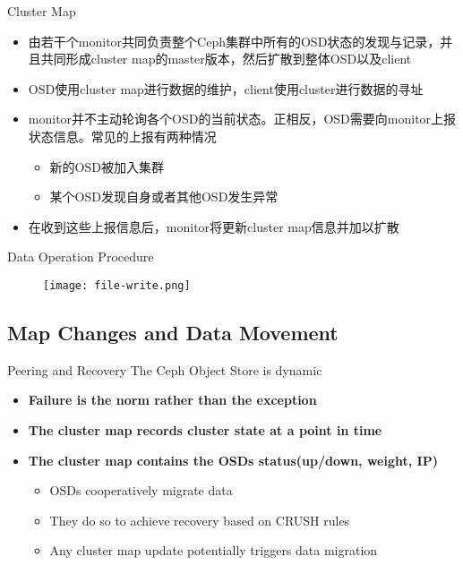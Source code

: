 \begin{frame}{Cluster Map}
    \begin{itemize}
        \item 由若干个monitor共同负责整个Ceph集群中所有的OSD状态的发现与记录，并且共同形成cluster map的master版本，然后扩散到整体OSD以及client
        \item OSD使用cluster map进行数据的维护，client使用cluster进行数据的寻址
        \item monitor并不主动轮询各个OSD的当前状态。正相反，OSD需要向monitor上报状态信息。常见的上报有两种情况
            \begin{itemize}
                \item 新的OSD被加入集群
                \item 某个OSD发现自身或者其他OSD发生异常
            \end{itemize}
        \item 在收到这些上报信息后，monitor将更新cluster map信息并加以扩散
    \end{itemize}
\end{frame}

\begin{frame}{Data Operation Procedure}
    \begin{figure}[htpb]
        \centering
        \texttt{[image: file-write.png]}
    \end{figure}
\end{frame}

\subsection{Map Changes and Data Movement}

\begin{frame}{Peering and Recovery}
    The Ceph Object Store is dynamic
    \begin{itemize}
        \item \textbf{Failure is the norm rather than the exception}
        \item \textbf{The cluster map records cluster state at a point in time}
        \item \textbf{The cluster map contains the OSDs status(up/down, weight, IP)}
            \begin{itemize}
                \item OSDs cooperatively migrate data
                \item They do so to achieve recovery based on CRUSH rules
                \item Any cluster map update potentially triggers data migration
            \end{itemize}
    \end{itemize}
\end{frame}


